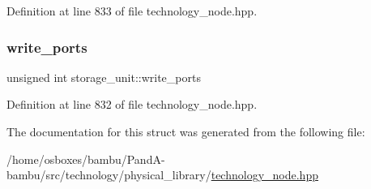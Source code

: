 Definition at line 833 of file technology\+\_\+node.\+hpp.

\mbox{\label{structstorage__unit_a1d5a2712f0fe954bc755c1b3626978d6}} 
\subsubsection{\texorpdfstring{write\+\_\+ports}{write\_ports}}
{\footnotesize\ttfamily unsigned int storage\+\_\+unit\+::write\+\_\+ports}



Definition at line 832 of file technology\+\_\+node.\+hpp.



The documentation for this struct was generated from the following file\+:\begin{DoxyCompactItemize}
\item 
/home/osboxes/bambu/\+Pand\+A-\/bambu/src/technology/physical\+\_\+library/\hyperlink{technology__node_8hpp}{technology\+\_\+node.\+hpp}\end{DoxyCompactItemize}
